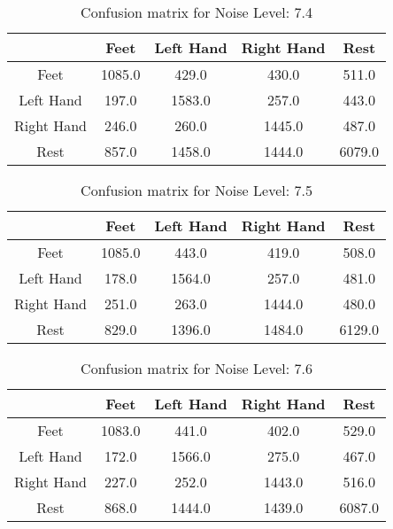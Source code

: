 \begin{table}[!htbp]
    \centering
    \begin{tabular}{|c||c|c|c|c|}
        \hline
		 & Feet & Left Hand & Right Hand & Rest \\
        \hline
        \hline
        Feet & 1085.0 & 429.0 & 430.0 & 511.0 \\
        \hline
        Left Hand & 197.0 & 1583.0 & 257.0 & 443.0 \\
        \hline
        Right Hand & 246.0 & 260.0 & 1445.0 & 487.0 \\
        \hline
        Rest & 857.0 & 1458.0 & 1444.0 & 6079.0 \\
        \hline
    \end{tabular}
    \caption{Confusion matrix for Noise Level: 7.4}
\end{table}

\begin{table}[!htbp]
    \centering
    \begin{tabular}{|c||c|c|c|c|}
        \hline
		 & Feet & Left Hand & Right Hand & Rest \\
        \hline
        \hline
        Feet & 1085.0 & 443.0 & 419.0 & 508.0 \\
        \hline
        Left Hand & 178.0 & 1564.0 & 257.0 & 481.0 \\
        \hline
        Right Hand & 251.0 & 263.0 & 1444.0 & 480.0 \\
        \hline
        Rest & 829.0 & 1396.0 & 1484.0 & 6129.0 \\
        \hline
    \end{tabular}
    \caption{Confusion matrix for Noise Level: 7.5}
\end{table}

\begin{table}[!htbp]
    \centering
    \begin{tabular}{|c||c|c|c|c|}
        \hline
		 & Feet & Left Hand & Right Hand & Rest \\
        \hline
        \hline
        Feet & 1083.0 & 441.0 & 402.0 & 529.0 \\
        \hline
        Left Hand & 172.0 & 1566.0 & 275.0 & 467.0 \\
        \hline
        Right Hand & 227.0 & 252.0 & 1443.0 & 516.0 \\
        \hline
        Rest & 868.0 & 1444.0 & 1439.0 & 6087.0 \\
        \hline
    \end{tabular}
    \caption{Confusion matrix for Noise Level: 7.6}
\end{table}

